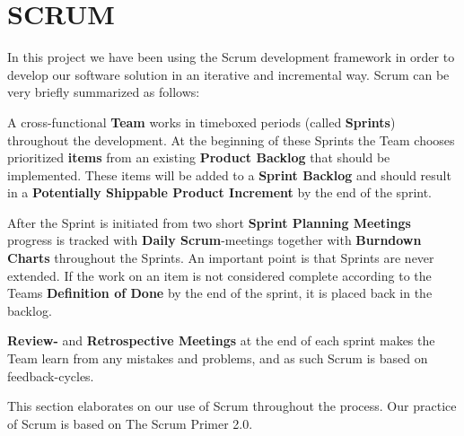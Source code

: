 \section{SCRUM}

In this project we have been using the Scrum development framework in order to develop our software solution in an iterative and incremental way. Scrum can be very briefly summarized as follows:

A cross-functional \textbf{Team} works in timeboxed periods (called \textbf{Sprints}) throughout the development. At the beginning of these Sprints the Team chooses prioritized \textbf{items} from an existing \textbf{Product Backlog} that should be implemented. These items will be added to a \textbf{Sprint Backlog} and should result in a \textbf{ Potentially Shippable Product Increment} by the end of the sprint.

After the Sprint is initiated from two short \textbf{Sprint Planning Meetings} progress is tracked with \textbf{Daily Scrum}-meetings together with \textbf{Burndown Charts} throughout the Sprints. An important point is that Sprints are never extended. If the work on an item is not considered complete according to the Teams \textbf{Definition of Done} by the end of the sprint, it is placed back in the backlog.

\textbf{Review-} and \textbf{Retrospective Meetings} at the end of each sprint makes the Team learn from any mistakes and problems, and as such Scrum is based on feedback-cycles.

This section elaborates on our use of Scrum throughout the process. Our practice of Scrum is based on The Scrum Primer 2.0\cite{ScrumPrimer2}.







